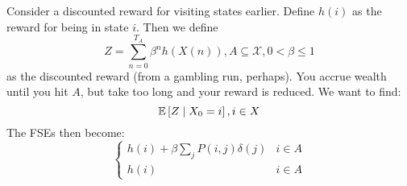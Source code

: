 \begin{note}
    Consider a discounted reward for visiting states earlier. Define $h(i)$ as the reward for being
    in state $i$. Then we define
    \[ Z = \sum_{n = 0}^{T_A} \beta^n h(X(n)), A \subseteq \mathcal{X}, 0 < \beta \leq 1 \]
    as the discounted reward (from a gambling run, perhaps). You accrue wealth until you hit $A$,
    but take too long and your reward is reduced. We want to find:
    \[ \mathbb{E}\left[ Z \mid X_0 = i \right], i \in X \]
    The FSEs then become:
    \[ \begin{cases}
        h(i) + \beta \sum_j P(i, j) \delta(j) & i \in A \\
        h(i) & i \in A
    \end{cases} \]
\end{note}